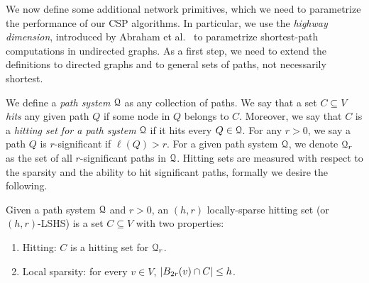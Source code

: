 We now define some additional network primitives, which we need to parametrize the performance of our CSP algorithms. 
In particular, we use the \emph{highway dimension}, introduced by Abraham et al.~\cite{highway2013,highway2010} to parametrize shortest-path computations in undirected graphs. As a first step, we need to extend the definitions to directed graphs and to general sets of paths, not necessarily shortest.


We define a \emph{path system} $\calQ$ as any collection of paths.
We say that a set $C\subseteq V$ \emph{hits} any given path $Q$ if some node in $Q$ belongs to $C$. Moreover, we say that $C$ is a \emph{hitting set for a path system} $\calQ$ if it hits every $Q\in\calQ$. 
For any $r>0$, we say a path $Q$ is $r$-significant if $\ell(Q)>r$. 
For a given path system $\calQ$, we denote $\calQ_r$ as the set of all $r$-significant paths in $\calQ$.
Hitting sets are measured with respect to the sparsity and the ability to hit significant paths, formally we desire the following.

\begin{definition}\label{def:lshs}
Given a path system $\calQ$ and $r>0$, an $(h,r)$ locally-sparse hitting set (or $(h,r)$-LSHS) is a set $C\subseteq V$ with two properties: 
\begin{enumerate}[nosep]
\item Hitting: $C$ is a hitting set for $\calQ_r$.
\item Local sparsity: for every $v\in V$, $\abs*{B_{2r}(v)\cap C}\leq h$.
\end{enumerate}
\end{definition}



